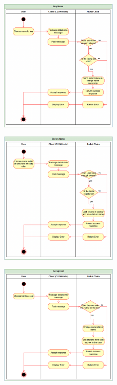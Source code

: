 \documentclass[a4paper]{article}
\begin{document}
\begin{figure}[!htbp]
\centering
\includegraphics[width=0.5\textwidth]{assets/rns4.png}
\caption{}
\end{figure}

\begin{figure}[!htbp]
\centering
\includegraphics[width=0.5\textwidth]{assets/rns5.png}
\caption{}
\end{figure}

\begin{figure}[!htbp]
\centering
\includegraphics[width=0.5\textwidth]{assets/rns6.png}
\caption{}
\end{figure}
\end{document}
